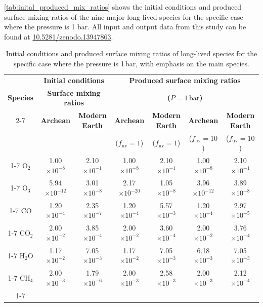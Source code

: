 \appendix

\autoref{tab:inital_produced_mix_ratios} shows the initial conditions and produced surface mixing ratios of the nine major long-lived species for the specific case where the pressure is 1 bar. All input and output data from this study can be found at \href{https://doi.org/10.5281/zenodo.13947863}{10.5281/zenodo.13947863}.

\begin{table}[h]
\centering
\caption{Initial conditions and produced surface mixing ratios of long-lived species for the specific case where the pressure is 1\,bar, with emphasis on the main species.}
\begin{tabular}{c|c|c|c|c|c|c}
\hline
\multicolumn{1}{c|}{} & \multicolumn{2}{c|}{\textbf{Initial conditions}} & \multicolumn{4}{c}{\textbf{Produced surface mixing ratios}} \\
\textbf{Species} & \multicolumn{2}{c|}{\textbf{Surface mixing ratios}} & \multicolumn{4}{c}{\textbf{($P=1\,\mathrm{bar}$)}} \\
\cline{2-7}  %
 & \textbf{Archean} & \textbf{Modern Earth} & \textbf{Archean} & \textbf{Modern Earth} & \textbf{Archean} & \textbf{Modern Earth} \\
 & & & ($f_\mathrm{uv}=1$) & ($f_\mathrm{uv}=1$) & ($f_\mathrm{uv}=10$) & ($f_\mathrm{uv}=10$) \\
\cline{1-7} %
O$_2$ & 1.00$\times10^{-8}$ & 2.10$\times10^{-1}$ & 1.00$\times10^{-8}$ & 2.10$\times10^{-1}$ & 1.00$\times10^{-8}$ & 2.10$\times10^{-1}$ \\ \cline{1-7}
O$_3$ & 5.94$\times10^{-12}$ & 3.01$\times10^{-8}$ & 2.17$\times10^{-20}$ & 1.05$\times10^{-8}$ & 3.96$\times10^{-12}$ & 3.89$\times10^{-8}$ \\ \cline{1-7}
CO & 1.20$\times10^{-4}$ & 2.35$\times10^{-7}$ & 1.20$\times10^{-4}$ & 5.57$\times10^{-3}$ & 1.20$\times10^{-4}$ & 2.97$\times10^{-5}$ \\ \cline{1-7}
CO$_2$ & 2.00$\times10^{-2}$ & 3.85$\times10^{-4}$ & 2.00$\times10^{-2}$ & 3.60$\times10^{-4}$ & 2.00$\times10^{-2}$ & 3.76$\times10^{-4}$ \\ \cline{1-7}
H$_2$O & 1.17$\times10^{-2}$ & 7.05$\times10^{-3}$ & 1.17$\times10^{-2}$ & 7.05$\times10^{-3}$ & 6.18$\times10^{-3}$ & 7.05$\times10^{-3}$ \\ \cline{1-7}
CH$_4$ & 2.00$\times10^{-3}$ & 1.79$\times10^{-6}$ & 2.00$\times10^{-3}$ & 2.58$\times10^{-3}$ & 2.00$\times10^{-3}$ & 2.12$\times10^{-4}$ \\ \cline{1-7}

\end{tabular}
\end{table}
